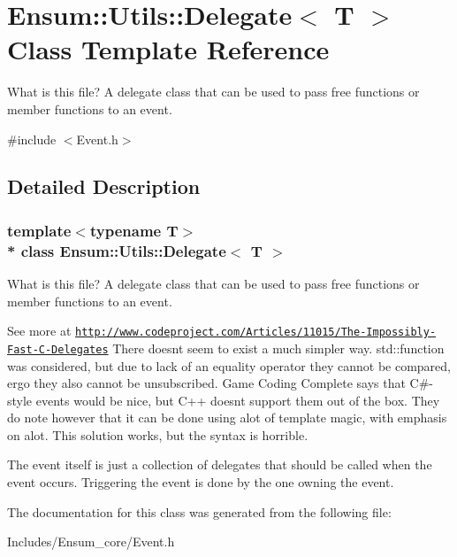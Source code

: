 \hypertarget{class_ensum_1_1_utils_1_1_delegate}{}\section{Ensum\+:\+:Utils\+:\+:Delegate$<$ T $>$ Class Template Reference}
\label{class_ensum_1_1_utils_1_1_delegate}


What is this file? A delegate class that can be used to pass free functions or member functions to an event.  




{\ttfamily \#include $<$Event.\+h$>$}



\subsection{Detailed Description}
\subsubsection*{template$<$typename T$>$\\*
class Ensum\+::\+Utils\+::\+Delegate$<$ T $>$}

What is this file? A delegate class that can be used to pass free functions or member functions to an event. 

See more at \href{http://www.codeproject.com/Articles/11015/The-Impossibly-Fast-C-Delegates}{\tt http\+://www.\+codeproject.\+com/\+Articles/11015/\+The-\/\+Impossibly-\/\+Fast-\/\+C-\/\+Delegates} There doesn\textquotesingle{}t seem to exist a much simpler way. std\+::function was considered, but due to lack of an equality operator they cannot be compared, ergo they also cannot be unsubscribed. Game Coding Complete says that C\#-\/style events would be nice, but C++ doesn\textquotesingle{}t support them out of the box. They do note however that it can be done using alot of template magic, with emphasis on alot. This solution works, but the syntax is horrible.

The event itself is just a collection of delegates that should be called when the event occurs. Triggering the event is done by the one owning the event. 

The documentation for this class was generated from the following file\+:\begin{DoxyCompactItemize}
\item 
Includes/\+Ensum\+\_\+core/Event.\+h\end{DoxyCompactItemize}
